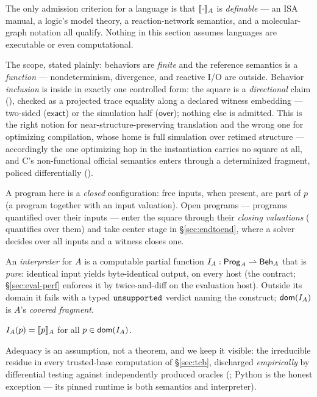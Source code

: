 The only admission criterion for a language is that $\llbracket \cdot \rrbracket_{A}$ is
\emph{definable} --- an ISA manual, a logic's model theory, a reaction-network
semantics, and a molecular-graph notation all qualify. Nothing in this
section assumes languages are executable or even computational.

The scope, stated plainly: behaviors are \emph{finite} and the
reference semantics is a \emph{function} --- nondeterminism,
divergence, and reactive I/O are outside. Behavior \emph{inclusion} is
inside in exactly one controlled form: the square is a
\emph{directional} claim (), checked as a
projected trace equality along a declared witness embedding —
two-sided ($\mathsf{exact}$) or the simulation half
($\mathsf{over}$); nothing else is admitted. This is the right notion
for near-structure-preserving translation and the wrong one for
optimizing compilation, whose home is full simulation over retimed
structure --- accordingly the one optimizing hop in the instantiation
carries no square at all, and C's non-functional official semantics
enters through a determinized fragment, policed differentially
().

A program here is a \emph{closed} configuration: free inputs, when present,
are part of $p$ (a program together with an input valuation). Open programs
--- programs quantified over their inputs --- enter the square through
their \emph{closing valuations} ( quantifies over
them) and take center stage in \S\ref{sec:endtoend}, where a solver
decides over all inputs and a witness closes one.

\begin{definition}[Interpreter]
\label{def:interpreter}
An \emph{interpreter} for $A$ is a computable partial function
$I_A : \mathsf{Prog}_{A} \rightharpoonup \mathsf{Beh}_{A}$ that is \emph{pure}: identical
input yields byte-identical output, on every host (the contract;
\S\ref{sec:eval-perf} enforces it by twice-and-diff on the evaluation
host). Outside its domain
it fails with a typed $\mathtt{unsupported}$ verdict naming the construct;
$\mathsf{dom}(I_A)$ is $A$'s \emph{covered fragment}.
\end{definition}

\begin{assumption}
\label{asm:adequacy}
$I_A(p) = \llbracket p \rrbracket_{A}$ for all $p \in \mathsf{dom}(I_A)$.
\end{assumption}

Adequacy is an assumption, not a theorem, and we keep it visible: the
irreducible residue in every trusted-base computation of
\S\ref{sec:tcb}, discharged \emph{empirically} by differential testing
against independently produced oracles (;
Python is the honest exception --- its pinned runtime is both semantics
and interpreter).

